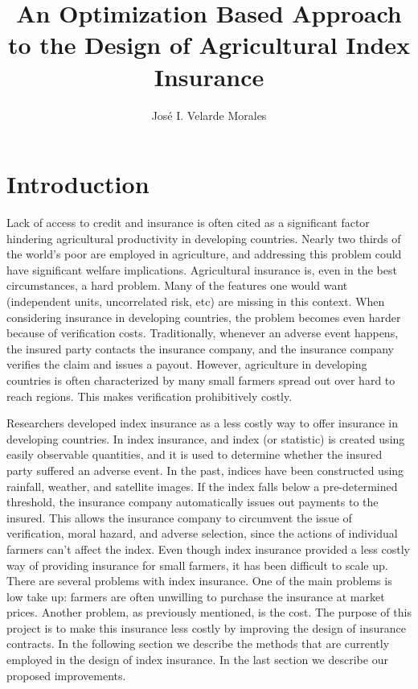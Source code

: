 \documentclass[11pt]{article}
\title{An Optimization Based Approach to the Design of Agricultural Index Insurance}
\author{José I. Velarde Morales}
\begin{document}
\maketitle
\section{Introduction}
Lack of access to credit and insurance is often cited as a significant factor hindering agricultural productivity in developing countries. Nearly two thirds of the world's poor are employed in agriculture, and addressing this problem could have significant welfare implications. Agricultural insurance is, even in the best circumstances, a hard problem. Many of the features one would want (independent units, uncorrelated risk, etc) are missing in this context. When considering insurance in developing countries, the problem becomes even harder because of verification costs. Traditionally, whenever an adverse event happens, the insured party contacts the insurance company, and the insurance company verifies the claim and issues a payout. However, agriculture in developing countries is often characterized by many small farmers spread out over hard to reach regions. This makes verification prohibitively costly. 

Researchers developed index insurance as a less costly way to offer insurance in developing countries. In index insurance, and index (or statistic) is created using easily observable quantities, and it is used to determine whether the insured party suffered an adverse event. In the past, indices have been constructed using rainfall, weather, and satellite images. If the index falls below a pre-determined threshold, the insurance company automatically issues out payments to the insured. This allows the insurance company to circumvent the issue of verification, moral hazard, and adverse selection, since the actions of individual farmers can't affect the index. Even though index insurance provided a less costly way of providing insurance for small farmers, it has been difficult to scale up. There are several problems with index insurance. One of the main problems is low take up: farmers are often unwilling to purchase the insurance at market prices. Another problem, as previously mentioned, is the cost. The purpose of this project is to make this insurance less costly by improving the design of insurance contracts. In the following section we describe the methods that are currently employed in the design of index insurance. In the last section we describe our proposed improvements. 
\end{document}
